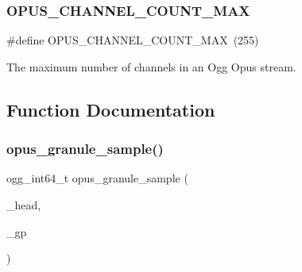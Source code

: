 \subsubsection{\texorpdfstring{O\+P\+U\+S\+\_\+\+C\+H\+A\+N\+N\+E\+L\+\_\+\+C\+O\+U\+N\+T\+\_\+\+M\+AX}{OPUS\_CHANNEL\_COUNT\_MAX}}
{\footnotesize\ttfamily \#define O\+P\+U\+S\+\_\+\+C\+H\+A\+N\+N\+E\+L\+\_\+\+C\+O\+U\+N\+T\+\_\+\+M\+AX~(255)}

The maximum number of channels in an Ogg Opus stream. 

\subsection{Function Documentation}
\mbox{\label{group__header__info_gaac9c6e1916fba6e53152b936055d3db0}} 
\subsubsection{\texorpdfstring{opus\+\_\+granule\+\_\+sample()}{opus\_granule\_sample()}}
{\footnotesize\ttfamily ogg\+\_\+int64\+\_\+t opus\+\_\+granule\+\_\+sample (\begin{DoxyParamCaption}\item[{\hyperlink{zconf_8h_a2c212835823e3c54a8ab6d95c652660e}{const} \hyperlink{struct_opus_head}{Opus\+Head} $\ast$}]{\+\_\+head,  }\item[{ogg\+\_\+int64\+\_\+t}]{\+\_\+gp }\end{DoxyParamCaption})}

